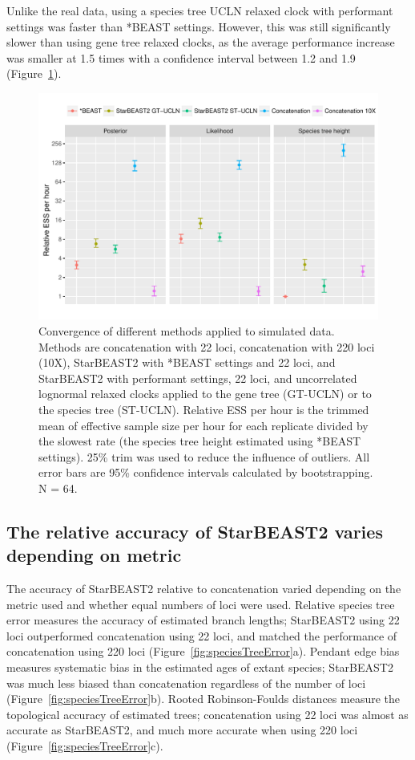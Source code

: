 \documentclass[12pt]{article}
\begin{document}
Unlike the real data, using a species tree UCLN relaxed clock with performant
settings was faster than *BEAST settings. However, this was still significantly
slower than using gene tree relaxed clocks, as the average performance increase
was smaller at 1.5 times with a confidence interval between 1.2 and 1.9
(Figure~\ref{fig:simulatedEssPerHour}).

\begin{figure}[htb!]
\centering
\includegraphics[width=16cm]{multiple_ess_per_hour.pdf}
\caption
{Convergence of different methods applied to simulated data. Methods are
concatenation with 22 loci, concatenation with 220 loci (10X), StarBEAST2 with
*BEAST settings and 22 loci, and StarBEAST2 with performant settings, 22 loci,
and uncorrelated lognormal relaxed clocks applied to the gene tree (GT-UCLN) or
to the species tree (ST-UCLN). Relative ESS per hour is the trimmed mean of
effective sample size per hour for each replicate divided by the slowest rate
(the species tree height estimated using *BEAST
settings). 25\% trim was used to reduce the influence of
outliers. All error bars are 95\% confidence intervals calculated by
bootstrapping. N = 64.}
\label{fig:simulatedEssPerHour}
\end{figure}

\subsection{The relative accuracy of StarBEAST2 varies depending on metric}

The accuracy of StarBEAST2 relative to concatenation varied depending on the
metric used and whether equal numbers of loci were used. Relative species tree
error measures the accuracy of estimated branch lengths; StarBEAST2 using 22
loci outperformed concatenation using 22 loci, and matched the performance of
concatenation using 220 loci (Figure~\ref{fig:speciesTreeError}a). Pendant
edge bias measures systematic bias in the estimated ages of extant species;
StarBEAST2 was much less biased than concatenation regardless of the number of loci
(Figure~\ref{fig:speciesTreeError}b). Rooted Robinson-Foulds distances measure
the topological accuracy of estimated trees; concatenation using 22 loci was
almost as accurate as StarBEAST2, and much more accurate when using 220 loci
(Figure~\ref{fig:speciesTreeError}c).
\end{document}
